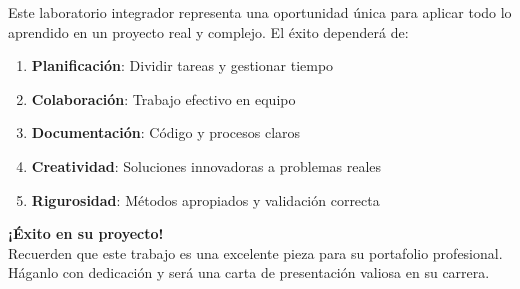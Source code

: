 \documentclass[12pt,a4paper]{article}
\begin{document}
Este laboratorio integrador representa una oportunidad única para aplicar todo lo aprendido en un proyecto real y complejo. El éxito dependerá de:

\begin{enumerate}
    \item \textbf{Planificación}: Dividir tareas y gestionar tiempo
    \item \textbf{Colaboración}: Trabajo efectivo en equipo
    \item \textbf{Documentación}: Código y procesos claros
    \item \textbf{Creatividad}: Soluciones innovadoras a problemas reales
    \item \textbf{Rigurosidad}: Métodos apropiados y validación correcta
\end{enumerate}

\begin{tipbox}
\textbf{¡Éxito en su proyecto!}\\
Recuerden que este trabajo es una excelente pieza para su portafolio profesional. Háganlo con dedicación y será una carta de presentación valiosa en su carrera.
\end{tipbox}
\end{document}
